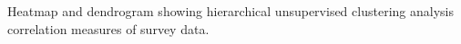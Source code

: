 Heatmap and dendrogram showing hierarchical unsupervised clustering analysis correlation measures of survey data.
\label{fig:heatmap}